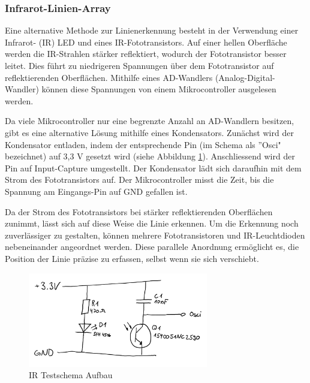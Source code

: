 \documentclass[../main.tex]{subfiles}
\begin{document}
\subsubsection{Infrarot-Linien-Array}
Eine alternative Methode zur Linienerkennung besteht in der Verwendung einer Infrarot- (IR) LED und eines IR-Fototransistors. Auf einer hellen Oberfläche werden die IR-Strahlen stärker reflektiert, wodurch der Fototransistor besser leitet. Dies führt zu niedrigeren Spannungen über dem Fototransistor auf reflektierenden Oberflächen. Mithilfe eines AD-Wandlers (Analog-Digital-Wandler) können diese Spannungen von einem Mikrocontroller ausgelesen werden.

Da viele Mikrocontroller nur eine begrenzte Anzahl an AD-Wandlern besitzen, gibt es eine alternative Lösung mithilfe eines Kondensators. Zunächst wird der Kondensator entladen, indem der entsprechende Pin (im Schema als ''Osci" bezeichnet) auf 3,3 V gesetzt wird (siehe Abbildung \ref{fig:IR_Schema}). Anschliessend wird der Pin auf Input-Capture umgestellt. Der Kondensator lädt sich daraufhin mit dem Strom des Fototransistors auf. Der Mikrocontroller misst die Zeit, bis die Spannung am Eingangs-Pin auf GND gefallen ist.

Da der Strom des Fototransistors bei stärker reflektierenden Oberflächen zunimmt, lässt sich auf diese Weise die Linie erkennen. Um die Erkennung noch zuverlässiger zu gestalten, können mehrere Fototransistoren und IR-Leuchtdioden nebeneinander angeordnet werden. Diese parallele Anordnung ermöglicht es, die Position der Linie präzise zu erfassen, selbst wenn sie sich verschiebt.


\begin{figure}[H] %
    \centering
    \includegraphics[width=0.7\textwidth]{img/sensortest/IR_Schema.png} %
    \caption{IR Testschema Aufbau}
    \label{fig:IR_Schema} %
\end{figure}
\end{document}
